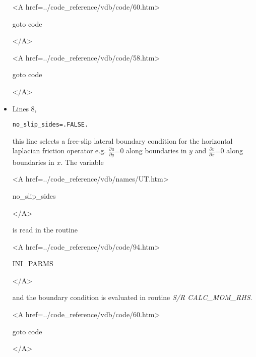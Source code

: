 \begin{itemize}
{\bf
\begin{rawhtml} <A href=../code_reference/vdb/code/60.htm> \end{rawhtml}
goto code
\begin{rawhtml} </A>\end{rawhtml}
}

{\bf
\begin{rawhtml} <A href=../code_reference/vdb/code/58.htm> \end{rawhtml}
goto code
\begin{rawhtml} </A>\end{rawhtml}
}

\item Lines 8,
\begin{verbatim}
no_slip_sides=.FALSE.
\end{verbatim}
this line selects a free-slip lateral boundary condition for
the horizontal laplacian friction operator 
e.g. $\frac{\partial u}{\partial y}$=0 along boundaries in $y$ and
$\frac{\partial v}{\partial x}$=0 along boundaries in $x$.
The variable
{\bf
\begin{rawhtml} <A href=../code_reference/vdb/names/UT.htm> \end{rawhtml}
no\_slip\_sides
\begin{rawhtml} </A>\end{rawhtml}
}
is read in the routine
{\it
\begin{rawhtml} <A href=../code_reference/vdb/code/94.htm> \end{rawhtml}
INI\_PARMS
\begin{rawhtml} </A>\end{rawhtml}
} and the boundary condition is evaluated in routine
{\it S/R CALC\_MOM\_RHS}.


{\bf
\begin{rawhtml} <A href=../code_reference/vdb/code/60.htm> \end{rawhtml}
goto code
\begin{rawhtml} </A>\end{rawhtml}
}


\end{itemize}
